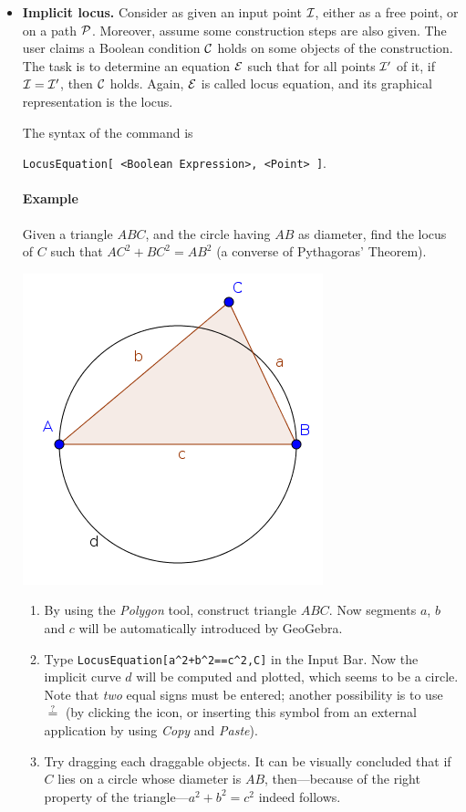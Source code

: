 \documentclass{article}
\begin{document}
\begin{itemize}
\item \textbf{Implicit locus.}
Consider as given an input point $\cal I$, either as a free point, or on a path $\cal P$. Moreover, assume some construction steps are also given. The user claims a Boolean condition $\cal C$  holds on some objects of the construction. The task is to determine an equation $\cal E$ such that for all points $\cal{I}'$ of it, if $\cal{I}=\cal{I}'$, then $\cal{C}$ holds. Again, $\cal{E}$ is called locus equation, and its graphical representation is the locus.

The syntax of the command is
\begin{center}
    \texttt{LocusEquation[ <Boolean Expression>, <Point> ]}.
\end{center}


\paragraph{Example}
Given a triangle $ABC$, and the circle having $AB$ as diameter, find the locus of $C$ such that $AC^2+BC^2=AB^2$ (a converse of Pythagoras' Theorem).
\begin{center}
\includegraphics[scale=0.5]{LocusEquation-example-implicit}
\end{center}
\begin{enumerate}
    \item By using the \textit{Polygon} tool, construct triangle $ABC$. Now segments $a$, $b$ and $c$ will be automatically introduced by GeoGebra.
    \item Type \texttt{LocusEquation[a\^{}2+b\^{}2==c\^{}2,C]} in the Input Bar. Now the implicit curve $d$ will be computed and plotted, which seems to be a circle.
    Note that \textit{two} equal signs must be entered; another possibility is to use $\stackrel{?}{=}$ (by clicking the \framebox{$\alpha$} icon, or inserting this symbol from an external application by using \textit{Copy} and \textit{Paste}).
    \item Try dragging each draggable objects. It can be visually concluded that if $C$ lies on a circle whose diameter is $AB$, then---because of the right property of the triangle---$a^2+b^2=c^2$ indeed follows.
\end{enumerate}
\end{itemize}
\end{document}
